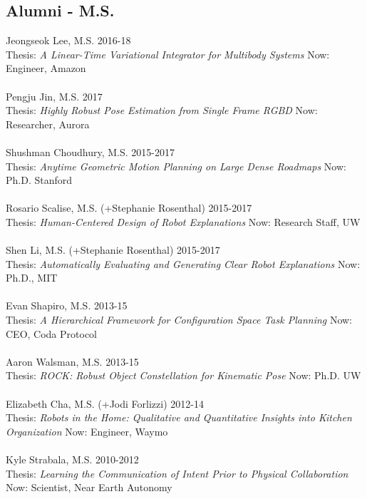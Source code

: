 \subsection{Alumni - M.S.}
\noindent
Jeongseok Lee, M.S. \hfill 2016-18\\
Thesis: \textit{A Linear-Time Variational Integrator for Multibody Systems}
\hfill Now: Engineer, Amazon\\
\\
Pengju Jin, M.S. \hfill 2017\\
Thesis: \textit{Highly Robust Pose Estimation from Single Frame RGBD}
\hfill Now: Researcher, Aurora\\
\\
Shushman Choudhury, M.S. \hfill 2015-2017\\
Thesis: \textit{Anytime Geometric Motion Planning on Large Dense Roadmaps} \hfill Now: Ph.D. Stanford\\
\\
Rosario Scalise, M.S. (+Stephanie Rosenthal) \hfill 2015-2017\\
Thesis: \textit{Human-Centered Design of Robot Explanations} \hfill Now: Research Staff, UW\\
\\
Shen Li, M.S. (+Stephanie Rosenthal) \hfill 2015-2017\\
Thesis: \textit{Automatically Evaluating and Generating Clear Robot Explanations} \hfill Now: Ph.D., MIT\\
\\
Evan Shapiro, M.S.  \hfill 2013-15\\
Thesis: \textit{A Hierarchical Framework for Configuration Space Task Planning} \hfill Now: CEO, Coda Protocol\\
\\
Aaron Walsman, M.S.  \hfill 2013-15\\
Thesis: \textit{ROCK: Robust Object Constellation for Kinematic Pose} \hfill Now: Ph.D. UW\\
\\
Elizabeth Cha, M.S. (+Jodi Forlizzi)  \hfill 2012-14\\
Thesis: \textit{Robots in the Home: Qualitative and Quantitative Insights into Kitchen Organization} \hfill Now: Engineer, Waymo\\
\\
Kyle Strabala, M.S. \hfill 2010-2012\\
Thesis: \textit{Learning the Communication of Intent Prior to Physical Collaboration} \hfill Now: Scientist, Near Earth Autonomy\\
